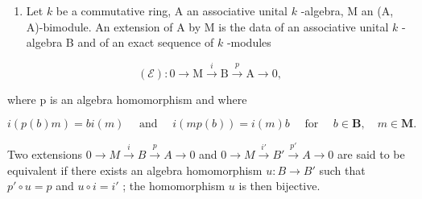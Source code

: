
\begin{enumerate}
\def\labelenumi{\arabic{enumi})}
\tightlist
\item
  Let \(k\) be a commutative ring, A an associative unital \(k\) -algebra, M an (A, A)-bimodule. An extension of A by M is the data of an associative unital \(k\) -algebra B and of an exact sequence of \(k\) -modules
\end{enumerate}

\[
(\mathcal {E}): 0 \rightarrow \mathrm{M} \stackrel {{i}} {{\rightarrow}} \mathrm{B} \stackrel {{p}} {{\rightarrow}} \mathrm{A} \rightarrow 0,
\]

where p is an algebra homomorphism and where

\[
i (p (b) m) = b i (m) \quad \text { and } \quad i (m p (b)) = i (m) b \quad \text { for } \quad b \in \mathbf {B}, \quad m \in \mathbf {M}.
\]

Two extensions \(0 \to M \xrightarrow{i} B \xrightarrow{p} A \to 0\) and \(0 \to M \xrightarrow{i'} B' \xrightarrow{p'} A \to 0\) are said to be equivalent if there exists an algebra homomorphism \(u: B \to B'\) such that \(p' \circ u = p\) and \(u \circ i = i'\) ; the homomorphism \(u\) is then bijective.

